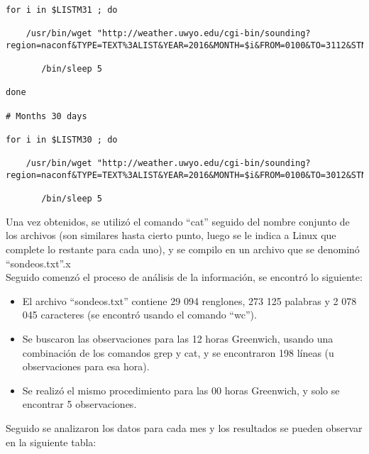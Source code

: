 \documentclass[12pt,letterpaper]{article}
\begin{document}
\begin{verbatim}  

for i in $LISTM31 ; do

    /usr/bin/wget "http://weather.uwyo.edu/cgi-bin/sounding?region=naconf&TYPE=TEXT%3ALIST&YEAR=2016&MONTH=$i&FROM=0100&TO=3112&STNM=76405"

       /bin/sleep 5

done

# Months 30 days

for i in $LISTM30 ; do

    /usr/bin/wget "http://weather.uwyo.edu/cgi-bin/sounding?region=naconf&TYPE=TEXT%3ALIST&YEAR=2016&MONTH=$i&FROM=0100&TO=3012&STNM=76405"

       /bin/sleep 5

\end{verbatim}  

Una vez obtenidos, se utilizó el comando “cat” seguido del nombre conjunto de los archivos (son similares hasta cierto punto, luego se le indica a Linux que complete lo restante para cada uno), y se compilo en un archivo que se denominó “sondeos.txt”.x \\

Seguido comenzó el proceso de análisis de la información, se encontró lo siguiente:\\
\begin{itemize}
\item El archivo “sondeos.txt” contiene 29 094 renglones, 273 125 palabras y 2 078 045 caracteres (se encontró usando el comando “wc”).
\item Se buscaron las observaciones para las 12 horas Greenwich, usando una combinación de los comandos grep y cat, y se encontraron 198 líneas (u observaciones para esa hora).  
\item Se realizó el mismo procedimiento para las 00 horas Greenwich, y solo se encontrar 5 observaciones.
\end{itemize}

Seguido se analizaron los datos para cada mes y los resultados se pueden observar en la siguiente tabla:\\
\end{document}
